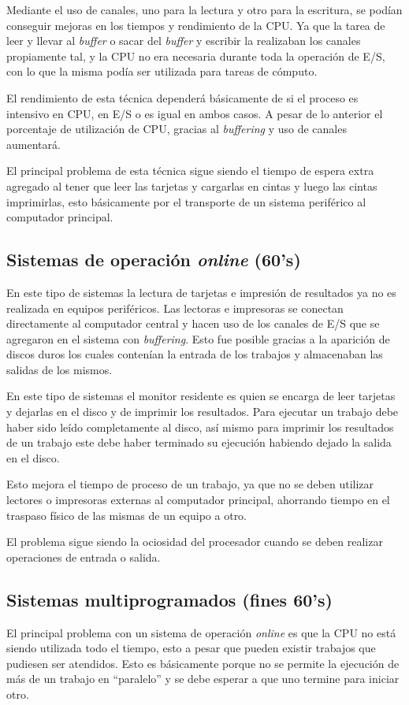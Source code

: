 Mediante el uso de canales, uno para la lectura y otro para la escritura, se
podían conseguir mejoras en los tiempos y rendimiento de la CPU. Ya que la tarea
de leer y llevar al \textit{buffer} o sacar del \textit{buffer} y escribir la
realizaban los canales propiamente tal, y la CPU no era necesaria durante toda
la operación de E/S, con lo que la misma podía ser utilizada para tareas de
cómputo.

El rendimiento de esta técnica dependerá básicamente de si el proceso es
intensivo en CPU, en E/S o es igual en ambos casos. A pesar de lo anterior el
porcentaje de utilización de CPU, gracias al \textit{buffering} y uso de canales
aumentará.

El principal problema de esta técnica sigue siendo el tiempo de espera extra
agregado al tener que leer las tarjetas y cargarlas en cintas y luego las cintas
imprimirlas, esto básicamente por el transporte de un sistema periférico al
computador principal.

\subsection{Sistemas de operación \textit{online} (60's)}
En este tipo de sistemas la lectura de tarjetas e impresión de resultados ya no
es realizada en equipos periféricos. Las lectoras e impresoras se conectan
directamente al computador central y hacen uso de los canales de E/S que se
agregaron en el sistema con \textit{buffering}. Esto fue posible gracias a la
aparición de discos duros los cuales contenían la entrada de los trabajos y
almacenaban las salidas de los mismos.

En este tipo de sistemas el monitor residente es quien se encarga de leer
tarjetas y dejarlas en el disco y de imprimir los resultados. Para ejecutar un
trabajo debe haber sido leído completamente al disco, así mismo para imprimir
los resultados de un trabajo este debe haber terminado su ejecución habiendo
dejado la salida en el disco.

Esto mejora el tiempo de proceso de un trabajo, ya que no se deben utilizar
lectores o impresoras externas al computador principal, ahorrando tiempo en el
traspaso físico de las mismas de un equipo a otro.

El problema sigue siendo la ociosidad del procesador cuando se deben realizar
operaciones de entrada o salida.

\subsection{Sistemas multiprogramados (fines 60's)}
El principal problema con un sistema de operación \textit{online} es que la CPU
no está siendo utilizada todo el tiempo, esto a pesar que pueden existir
trabajos que pudiesen ser atendidos. Esto es básicamente porque no se permite la
ejecución de más de un trabajo en ``paralelo'' y se debe esperar a que uno
termine para iniciar otro.

